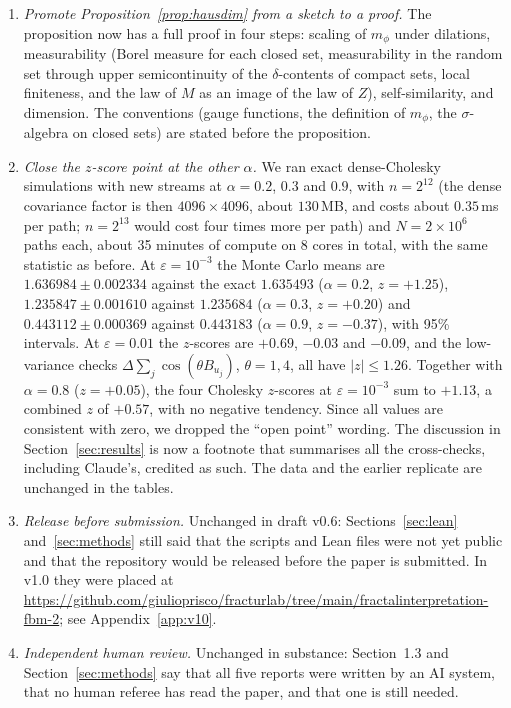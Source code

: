 \documentclass[11pt]{article}
\theoremstyle{remark}
\theoremstyle{definition}
\begin{document}
\begin{enumerate}
\item \emph{Promote Proposition~\ref{prop:hausdim} from a sketch to a proof.} The proposition now has a full proof in four steps: scaling of $m_\phi$ under dilations, measurability (Borel measure for each closed set, measurability in the random set through upper semicontinuity of the $\delta$-contents of compact sets, local finiteness, and the law of $M$ as an image of the law of $Z$), self-similarity, and dimension. The conventions (gauge functions, the definition of $m_\phi$, the $\sigma$-algebra on closed sets) are stated before the proposition.
\item \emph{Close the $z$-score point at the other $\alpha$.} We ran exact dense-Cholesky simulations with new streams at $\alpha=0.2$, $0.3$ and $0.9$, with $n=2^{12}$ (the dense covariance factor is then $4096\times4096$, about $130$\,MB, and costs about $0.35$\,ms per path; $n=2^{13}$ would cost four times more per path) and $N=2\times10^6$ paths each, about 35 minutes of compute on 8 cores in total, with the same statistic as before. At $\varepsilon=10^{-3}$ the Monte Carlo means are $1.636984\pm0.002334$ against the exact $1.635493$ ($\alpha=0.2$, $z=+1.25$), $1.235847\pm0.001610$ against $1.235684$ ($\alpha=0.3$, $z=+0.20$) and $0.443112\pm0.000369$ against $0.443183$ ($\alpha=0.9$, $z=-0.37$), with 95\% intervals. At $\varepsilon=0.01$ the $z$-scores are $+0.69$, $-0.03$ and $-0.09$, and the low-variance checks $\Delta\sum_j\cos(\theta B_{u_j})$, $\theta=1,4$, all have $|z|\le1.26$. Together with $\alpha=0.8$ ($z=+0.05$), the four Cholesky $z$-scores at $\varepsilon=10^{-3}$ sum to $+1.13$, a combined $z$ of $+0.57$, with no negative tendency. Since all values are consistent with zero, we dropped the ``open point'' wording. The discussion in Section~\ref{sec:results} is now a footnote that summarises all the cross-checks, including Claude's, credited as such. The data and the earlier replicate are unchanged in the tables.
\item \emph{Release before submission.} Unchanged in draft v0.6: Sections~\ref{sec:lean} and~\ref{sec:methods} still said that the scripts and Lean files were not yet public and that the repository would be released before the paper is submitted. In v1.0 they were placed at \url{https://github.com/giulioprisco/fracturlab/tree/main/fractalinterpretation-fbm-2}; see Appendix~\ref{app:v10}.
\item \emph{Independent human review.} Unchanged in substance: Section~1.3 and Section~\ref{sec:methods} say that all five reports were written by an AI system, that no human referee has read the paper, and that one is still needed.
\end{enumerate}
\end{document}
